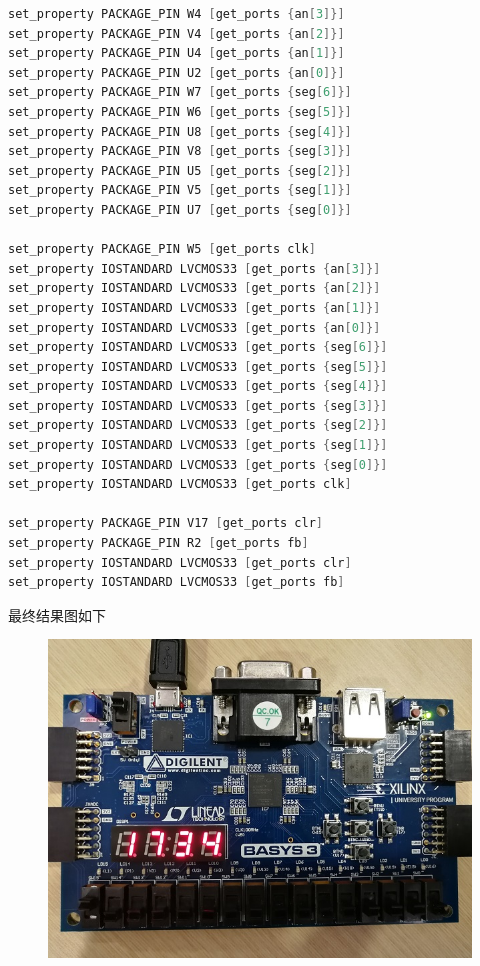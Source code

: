 \documentclass[11pt,UTF8]{ctexart}
\begin{document}
\begin{lstlisting}[language=Verilog]
set_property PACKAGE_PIN W4 [get_ports {an[3]}]
set_property PACKAGE_PIN V4 [get_ports {an[2]}]
set_property PACKAGE_PIN U4 [get_ports {an[1]}]
set_property PACKAGE_PIN U2 [get_ports {an[0]}]
set_property PACKAGE_PIN W7 [get_ports {seg[6]}]
set_property PACKAGE_PIN W6 [get_ports {seg[5]}]
set_property PACKAGE_PIN U8 [get_ports {seg[4]}]
set_property PACKAGE_PIN V8 [get_ports {seg[3]}]
set_property PACKAGE_PIN U5 [get_ports {seg[2]}]
set_property PACKAGE_PIN V5 [get_ports {seg[1]}]
set_property PACKAGE_PIN U7 [get_ports {seg[0]}]

set_property PACKAGE_PIN W5 [get_ports clk]
set_property IOSTANDARD LVCMOS33 [get_ports {an[3]}]
set_property IOSTANDARD LVCMOS33 [get_ports {an[2]}]
set_property IOSTANDARD LVCMOS33 [get_ports {an[1]}]
set_property IOSTANDARD LVCMOS33 [get_ports {an[0]}]
set_property IOSTANDARD LVCMOS33 [get_ports {seg[6]}]
set_property IOSTANDARD LVCMOS33 [get_ports {seg[5]}]
set_property IOSTANDARD LVCMOS33 [get_ports {seg[4]}]
set_property IOSTANDARD LVCMOS33 [get_ports {seg[3]}]
set_property IOSTANDARD LVCMOS33 [get_ports {seg[2]}]
set_property IOSTANDARD LVCMOS33 [get_ports {seg[1]}]
set_property IOSTANDARD LVCMOS33 [get_ports {seg[0]}]
set_property IOSTANDARD LVCMOS33 [get_ports clk]

set_property PACKAGE_PIN V17 [get_ports clr]
set_property PACKAGE_PIN R2 [get_ports fb]
set_property IOSTANDARD LVCMOS33 [get_ports clr]
set_property IOSTANDARD LVCMOS33 [get_ports fb]
\end{lstlisting}
\par 最终结果图如下
\begin{figure}[H]
    \centering
    \includegraphics[width=0.8\linewidth]{fig/b1.jpg}
\end{figure}
\end{document}
